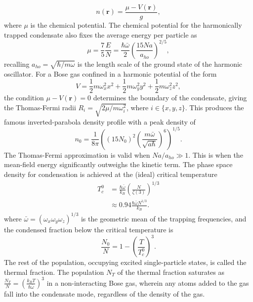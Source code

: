 	
	\begin{equation}
		n(\textbf{r}) = \frac{\mu-V(\textbf{r})}{g},
	\end{equation}
	where $\mu$ is the chemical potential.
	The chemical potential for the harmonically trapped condensate also fixes the average energy per particle as
	\begin{equation}
		\mu = \frac{7}{5}\frac{E}{N} = \frac{\hbar\bar{\omega}}{2}\left(\frac{15 N a}{a_{ho}}\right)^{2/5} ,
	\end{equation}
	recalling $a_{ho} = \sqrt{\hbar/m\omega}$ is the length scale of the ground state of the harmonic oscillator.
	For a Bose gas confined in a harmonic potential of the form
	\begin{equation}
		V = \frac{1}{2} m \omega_x^2 x^2 + \frac{1}{2} m \omega_y^2 y^2 + \frac{1}{2} m \omega_z^2 z^2,
	\end{equation}
	the condition $\mu-V(\textbf{r})=0$ determines the boundary of the condensate, giving the Thomas-Fermi radii $R_i = \sqrt{2\mu/m \omega_i^2}$, where $i\in\{x,y,z\}$.
	This produces the famous inverted-parabola density profile with a peak density of
	\begin{equation}
		n_0 = \frac{1}{8 \pi}\left( (15N_0)^2 \left(\frac{m \bar{\omega}}{\sqrt{a \hbar}}\right)^{6}\right)^{1/5}.
		\label{eqn:n0}
	\end{equation}
	The Thomas-Fermi approximation is valid when $N a/a_{ho}\gg1$. 
	This is when the mean-field energy significantly outweighs the kinetic term.
	The phase space density for condensation is achieved at the (ideal) critical temperature 
	\begin{align}
		T_c^{0} &= \frac{\hbar \bar{\omega}}{k_B}\left(\frac{N}{\zeta(3)}\right)^{1/3}\\
				&\approx0.94\frac{\hbar \bar{\omega} N^{1/3}}{k_B}.
	\end{align}
	where $\bar{\omega}=(\omega_x\omega_y\omega_z)^{1/3}$ is the geometric mean of the trapping frequencies, and the condensed fraction below the critical temperature is 
	\begin{equation}
		\frac{N_0}{N} = 1 - \left(\frac{T}{T_c^{0}}\right)^3.
	\end{equation}
	The rest of the population, occupying excited single-particle states, is called the thermal fraction.
	The population $N_T$ of the thermal fraction saturates as $\frac{N_T}{N} = \left(\frac{k_B T}{\hbar \bar{\omega}}\right)^3$ in a non-interacting Bose gas, wherein any atoms added to the gas fall into the condensate mode, regardless of the density of the gas.
